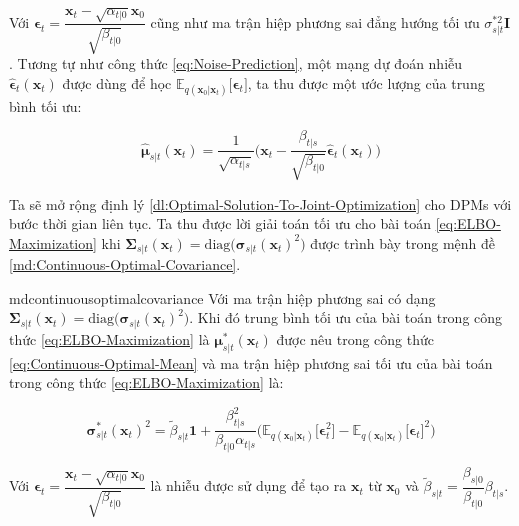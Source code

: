 \documentclass[14pt, a4paper]{article}
\numberwithin{equation}{section}
\numberwithin{figure}{section}
\numberwithin{dl}{section}
\numberwithin{md}{section}
\numberwithin{bd}{section}
\numberwithin{dn}{section}
\numberwithin{hq}{section}
\begin{document}
    Với $\boldsymbol{\epsilon}_t = \dfrac{\boldsymbol{x}_t - \sqrt{\alpha_{t \vert 0}} \boldsymbol{x}_0}{\sqrt{\beta_{t \vert 0}}}$ cũng như ma trận hiệp phương sai đẳng hướng tối ưu $\sigma_{s \vert t}^{\ast 2} \boldsymbol{I}$.
    Tương tự như công thức \ref{eq:Noise-Prediction}, một mạng dự đoán nhiễu $\hat{\boldsymbol{\epsilon}}_t (\boldsymbol{x}_t)$ được dùng để học $\mathbb{E}_{q(\boldsymbol{x}_0 \vert \boldsymbol{x}_t)}  \lbrack \boldsymbol{\epsilon}_t \rbrack$,
    ta thu được một ước lượng của trung bình tối ưu:

    \begin{equation} \label{eq:Estimated-Continuous-Optimal-Mean}
        \hat{\boldsymbol{\mu}}_{s \vert t} (\boldsymbol{x}_t) = \dfrac{1}{\sqrt{\alpha_{t \vert s}}} \Big( \boldsymbol{x}_t - \dfrac{\beta_{t \vert s}}{\sqrt{\beta_{t \vert 0}}} \hat{\boldsymbol{\epsilon}}_t (\boldsymbol{x}_t) \Big)
    \end{equation}

    Ta sẽ mở rộng định lý \ref{dl:Optimal-Solution-To-Joint-Optimization} cho DPMs với bước thời gian liên tục.
    Ta thu được lời giải toán tối ưu cho bài toán \ref{eq:ELBO-Maximization} khi $\boldsymbol{\Sigma}_{s \vert t} (\boldsymbol{x}_t)=\mathrm{diag}\big(\boldsymbol{\sigma}_{s \vert t} (\boldsymbol{x}_t)^2 \big)$ được trình bày trong mệnh đề \ref{md:Continuous-Optimal-Covariance}.

    \begin{restatable}{md}{continuousoptimalcovariance} \label{md:Continuous-Optimal-Covariance}
        Với ma trận hiệp phương sai có dạng $\boldsymbol{\Sigma}_{s \vert t} (\boldsymbol{x}_t)=\mathrm{diag}\big(\boldsymbol{\sigma}_{s \vert t} (\boldsymbol{x}_t)^2 \big)$.
        Khi đó trung bình tối ưu của bài toán trong công thức \ref{eq:ELBO-Maximization} là $\boldsymbol{\mu}_{s \vert t}^{\ast} (\boldsymbol{x}_t)$ được nêu trong công thức \ref{eq:Continuous-Optimal-Mean} và ma trận hiệp phương sai tối ưu của bài toán trong công thức \ref{eq:ELBO-Maximization} là:

        \begin{equation*}
            \boldsymbol{\sigma}_{s \vert t}^{\ast} (\boldsymbol{x}_t)^2 = \tilde{\beta}_{s \vert t} \boldsymbol{1} + \dfrac{\beta_{t \vert s}^2}{\beta_{t \vert 0} \alpha_{t \vert s}} \Big( \mathbb{E}_{q(\boldsymbol{x}_0 \vert \boldsymbol{x}_t)} \lbrack \boldsymbol{\epsilon}_t^2 \rbrack - \mathbb{E}_{q(\boldsymbol{x}_0 \vert \boldsymbol{x}_t)} \lbrack \boldsymbol{\epsilon}_t \rbrack^2 \Big)
        \end{equation*}

        Với $\boldsymbol{\epsilon}_t = \dfrac{\boldsymbol{x}_t - \sqrt{\alpha_{t \vert 0}} \boldsymbol{x}_0}{\sqrt{\beta_{t \vert 0}}}$ là nhiễu được sử dụng để tạo ra $\boldsymbol{x}_t$ từ $\boldsymbol{x}_0$ và $\tilde{\beta}_{s \vert t} = \dfrac{\beta_{s \vert 0}}{\beta_{t \vert 0}} \beta_{t \vert s}$.
    \end{restatable}
\end{document}
